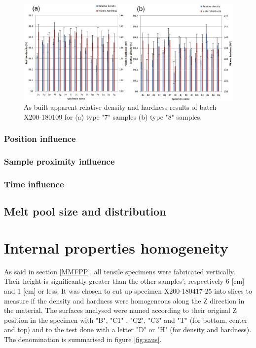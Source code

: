 \begin{figure}[ht]
\centering
\centerline{\includegraphics[scale=0.65]{Images/HD-180109-both}}
\decoRule
\caption[As-built apparent relative density and hardness results of batch X200-180109 for (a) type "7" samples (b) type "8" samples.]{As-built apparent relative density and hardness results of batch X200-180109 for (a) type "7" samples (b) type "8" samples.}
\label{fig:HD-171024}
\end{figure} 



\subsubsection{Position influence}


\subsubsection{Sample proximity influence}

\subsubsection{Time influence}

\subsection{Melt pool size and distribution}

\section{Internal properties homogeneity}
As said in section \ref{MMFPP}, all tensile specimens were fabricated vertically. Their height is significantly greater than the other samples'; respectively 6 [cm] and 1 [cm] or less. It was chosen to cut up specimen X200-180417-25 into slices to measure if the density and hardness were homogeneous along the Z direction in the material. The surfaces analysed were named according to their original Z position in the specimen with "B", "C1" , "C2", "C3" and "T" (for bottom, center and top) and to the test done with a letter "D" or "H"  (for density and hardness). The denomination is summarised in figure \ref{fig:saus}.\\

